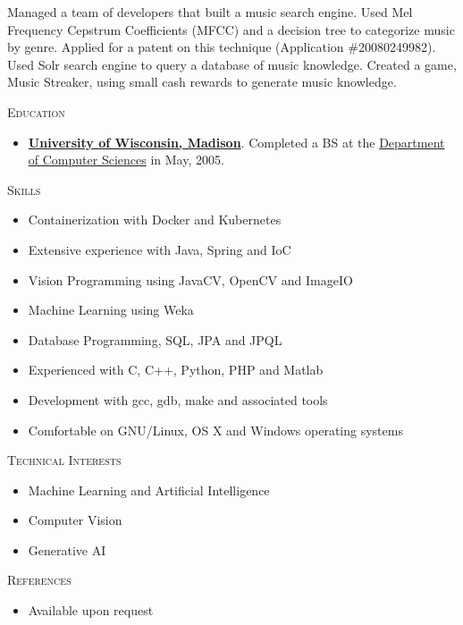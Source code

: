 \documentclass{article}
\begin{document}
\begin{description}
\begin{itemize}
      Managed a team of developers that built a music search engine.
      Used Mel Frequency Cepstrum Coefficients (MFCC) and a decision tree
      to categorize music by genre.  Applied for a patent on this technique
      (Application \#20080249982). Used Solr search engine to query a 
      database of music knowledge.  Created a game, Music Streaker, 
      using small cash rewards to generate music knowledge.

     
    \end{itemize}

  \item \textsc{Education}
    \begin{itemize}
    \item \textbf{\href{http://www.wisc.edu/} {University of Wisconsin, Madison}}.  Completed a BS at the
      \href{http://www.cs.wisc.edu/}{Department of Computer Sciences} in May, 2005.
    \end{itemize}
    
  \item \textsc{Skills}
    \begin{itemize}
      \item Containerization with Docker and Kubernetes 
      \item Extensive experience with Java, Spring and IoC
      \item Vision Programming using JavaCV, OpenCV and ImageIO
      \item Machine Learning using Weka
      \item Database Programming, SQL, JPA and JPQL
      \item Experienced with C, C++, Python, PHP and Matlab
      \item Development with gcc, gdb, make and associated tools
      \item Comfortable on GNU/Linux, OS X and Windows operating systems
    \end{itemize}
    
  \item \textsc{Technical Interests}
    \begin{itemize}
    \item Machine Learning and Artificial Intelligence
    \item Computer Vision
    \item Generative AI
    \end{itemize}
    
  \item \textsc{References}
    \begin{itemize}
    \item Available upon request
    \end{itemize}
    
  \end{description}
\end{document}
